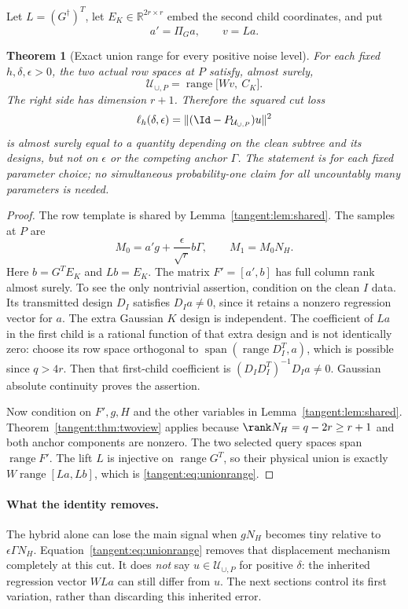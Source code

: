 \documentclass[11pt,oneside,openany,a4paper]{book}
\numberwithin{equation}{chapter}
\newtheorem{theorem}{Theorem}[chapter]
\theoremstyle{definition}
\theoremstyle{remark}
\newcommand{\R}{\mathbb R}\newcommand{\E}{\mathbb E}\newcommand{\Prb}{\mathbb P}\newcommand{\PP}{\mathbb P}
\DeclareMathOperator{\ran}{range}\DeclareMathOperator{\OPT}{OPT}
\begin{document}
Let $L=(G^\dagger)^T$, let $E_K\in\R^{2r\times r}$ embed the second child coordinates, and put
\[
 a'=\Pi_Ga,\qquad v=La.
\]
\begin{theorem}[Exact union range for every positive noise level]\label{tangent:thm:exactunion}
For each fixed $h,\delta,\epsilon>0$, the two actual row spaces at $P$ satisfy, almost surely,
\begin{equation}\label{tangent:eq:unionrange}
 \boxed{\mathcal U_{\cup,P}
   =\ran\bigl[Wv,\ C_K\bigr].}
\end{equation}
The right side has dimension $r+1$. Therefore the squared cut loss
\begin{equation}\label{tangent:eq:ell}
 \ell_h(\delta,\epsilon)
   =\|(\Id-P_{\mathcal U_{\cup,P}})u\|^2
\end{equation}
is almost surely equal to a quantity depending on the clean subtree and its designs, but not on $\epsilon$ or the competing anchor $\Gamma$. The statement is for each fixed parameter choice; no simultaneous probability-one claim for all uncountably many parameters is needed.
\end{theorem}
\begin{proof}
The row template is shared by Lemma~\ref{tangent:lem:shared}. The samples at $P$ are
\[
 M_0=a'g+\frac\epsilon{\sqrt r}b\Gamma,\qquad M_1=M_0N_H.
\]
Here $b=G^TE_K$ and $Lb=E_K$. The matrix $F'=[a',b]$ has full column rank almost surely. To see the only nontrivial assertion, condition on the clean $I$ data. Its transmitted design $D_I$ satisfies $D_Ia\ne0$, since it retains a nonzero regression vector for $a$. The extra Gaussian $K$ design is independent. The coefficient of $La$ in the first child is a rational function of that extra design and is not identically zero: choose its row space orthogonal to $\operatorname{span}(\ran D_I^T,a)$, which is possible since $q>4r$. Then that first-child coefficient is $(D_ID_I^T)^{-1}D_Ia\ne0$. Gaussian absolute continuity proves the assertion.

Now condition on $F',g,H$ and the other variables in Lemma~\ref{tangent:lem:shared}. Theorem~\ref{tangent:thm:twoview} applies because $\rank N_H=q-2r\ge r+1$ and both anchor components are nonzero. The two selected query spaces span $\ran F'$. The lift $L$ is injective on $\ran G^T$, so their physical union is exactly $W\ran[La,Lb]$, which is \eqref{tangent:eq:unionrange}.
\end{proof}

\paragraph{What the identity removes.}
The hybrid alone can lose the main signal when $gN_H$ becomes tiny relative to $\epsilon\Gamma N_H$. Equation~\eqref{tangent:eq:unionrange} removes that displacement mechanism completely at this cut. It does \emph{not} say $u\in\mathcal U_{\cup,P}$ for positive $\delta$: the inherited regression vector $WLa$ can still differ from $u$. The next sections control its first variation, rather than discarding this inherited error.
\end{document}
